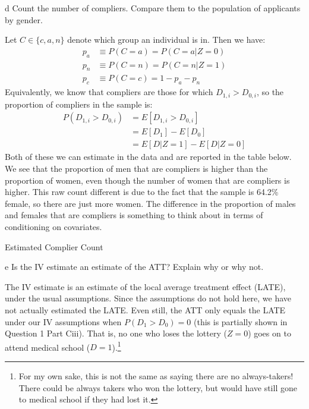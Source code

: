 \documentclass{article}
\begin{document}
\begin{problem}{d}
Count the number of compliers. Compare them to the population of applicants by gender.
\end{problem}
\begin{solution}
Let $C \in \{c,a,n \}$ denote which group an individual is in. Then we have:
\begin{align*}
    p_a &\equiv P(C=a) = P(C=a|Z=0) \\
    p_n &\equiv P(C=n) = P(C=n|Z=1) \\
    p_c &\equiv P(C=c) = 1 - p_a - p_n
\end{align*}
Equivalently, we know that compliers are those for which $D_{1,i}>D_{0,i}$, so the proportion of compliers in the sample is:
\begin{align*}
    P(D_{1,i}>D_{0,i}) &= E[D_{1,i}>D_{0,i}] \\
    &= E[D_1] - E[D_0] \\
    &= E[D|Z=1] - E[D|Z=0]
\end{align*}
Both of these we can estimate in the data and are reported in the table below. We see that the proportion of men that are compliers is higher than the proportion of women, even though the number of women that are compliers is higher. This raw count different is due to the fact that the sample is 64.2\% female, so there are just more women. The difference in the proportion of males and females that are compliers is something to think about in terms of conditioning on covariates.

\begin{table}[H]
    \centering
    
    \caption{Estimated Complier Count}
\end{table}
\end{solution}

\begin{problem}{e}
Is the IV estimate an estimate of the ATT? Explain why or why not.
\end{problem}
\begin{solution}
The IV estimate is an estimate of the local average treatment effect (LATE), under the usual assumptions. Since the assumptions do not hold here, we have not actually estimated the LATE. Even still, the ATT only equals the LATE under our IV assumptions when $P(D_1>D_0)=0$ (this is partially shown in Question 1 Part Ciii). That is, no one who loses the lottery ($Z=0$) goes on to attend medical school ($D=1$).\footnote{For my own sake, this is not the same as saying there are no always-takers! There could be always takers who won the lottery, but would have still gone to medical school if they had lost it.}
\end{solution}
\end{document}
